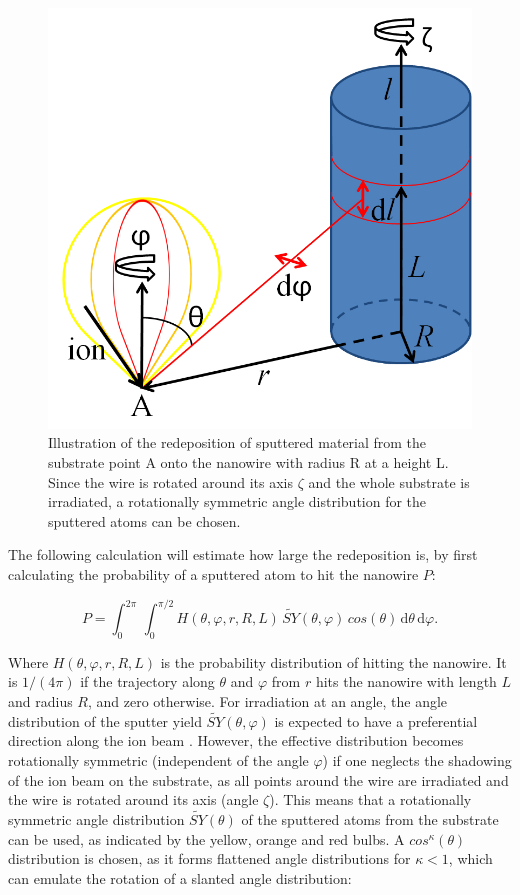 \begin{figure}
	\centering
		\includegraphics[width=.48\textwidth]{images/redeposit.jpg}
	\caption{Illustration of the redeposition of sputtered material from the substrate point A onto the nanowire with radius R at a height L. Since the wire is rotated around its axis $\zeta$ and the whole substrate is irradiated, a rotationally symmetric angle distribution for the sputtered atoms can be chosen.} 
	\label{redeposit}
\end{figure}

The following calculation will estimate how large the redeposition is, by first calculating the probability of a sputtered atom to hit the nanowire $P$:

\begin{equation}
\label{prob1}
P = \int_0^{2\pi} \! \,\int_0^{\pi/2} \!\! H(\theta,\varphi,r,R,L) \, \tilde{SY}(\theta,\varphi) \,cos(\theta)\,\mathrm{d}\theta \, \mathrm{d}\varphi.
\end{equation}

Where $H(\theta,\varphi,r,R,L)$ is the probability distribution of hitting the nanowire. It is $1/(4\pi)$ if the trajectory along $\theta$ and $\varphi$ from $r$ hits the nanowire with length $L$ and radius $R$, and zero otherwise. For irradiation at an angle, the angle distribution of the sputter yield $\tilde{SY}(\theta,\varphi)$ is expected to have a preferential direction along the ion beam \cite{verdeil_angular_2008}. However, the effective distribution becomes rotationally symmetric (independent of the angle $\varphi$) if one neglects the shadowing of the ion beam on the substrate, as all points around the wire are irradiated and the wire is rotated around its axis (angle $\zeta$). This means that a rotationally symmetric angle distribution $\tilde{SY}(\theta)$ of the sputtered atoms from the substrate can be used, as indicated by the yellow, orange and red bulbs. A $cos^\kappa(\theta)$ distribution is chosen, as it forms flattened angle distributions for $\kappa < 1$, which can emulate the rotation of a slanted angle distribution: 

